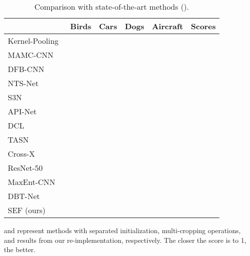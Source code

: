 \documentclass[journal]{IEEEtran}
\begin{document}
\begin{table}[h]
    \centering
    \caption{Comparison with state-of-the-art methods ().}
    \begin{threeparttable}
    \begin{tabular}[width=\linewidth]{lcccc|c}
        \toprule
            & Birds & Cars & Dogs &Aircraft & Scores\\
        \midrule
        Kernel-Pooling~\cite{kp@17cvpr}           &             &             &                                &             &\\
        MAMC-CNN~\cite{mamc18eccv}                          &             &             &                             &                &\\
        DFB-CNN~\cite{dfbnet18larry}              &             &             &                                &             &\\
        NTS-Net~\cite{ntscnn@eccv}              &             &             &                                &             &\\
        
        S3N~\cite{s3n@19iccv}                   &    &             &                                &             &\\
        API-Net~\cite{attentive_pairwise_interaction@20aaai}&             &    &                             &    &\\
        DCL~\cite{dcl@meitao}                               &             &             &                                &    &\\
        TASN~\cite{trilinear_attention@luojiebo}&             &             &                                &                &\\
        Cross-X~\cite{crossx@luowei}                        &             &             &                    &             &\\
        \midrule
        ResNet-50~\cite{resnet16kaiming}       &             &             &                             &             &\\
        MaxEnt-CNN~\cite{maxent@18nips}        &             &             &                             &             &\\
        DBT-Net~\cite{dbtnet@19nips}                        &             &             &                                &             &\\
        \midrule
        SEF (ours)                                          &             &             &                             &             &\\
        \bottomrule
    \end{tabular}
    \begin{tablenotes}[flushleft]
        \item {\small  and  represent methods with separated initialization, multi-cropping operations, and results from our re-implementation, respectively. The closer the score is to 1, the better.}
    \end{tablenotes}
    \end{threeparttable}
    \label{tab:comparison}
\end{table}
\end{document}
